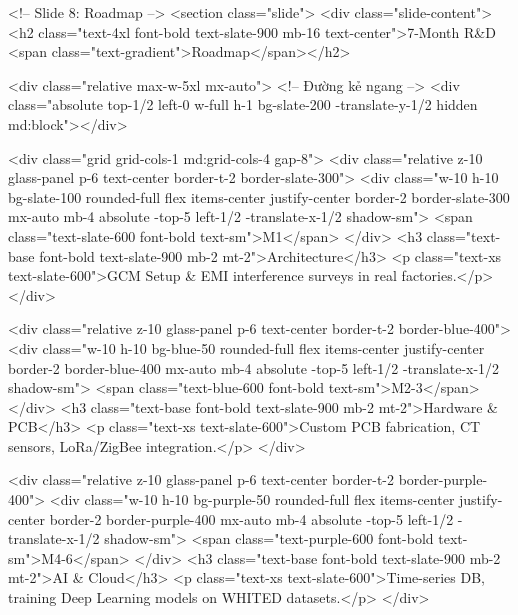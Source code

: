         <!-- Slide 8: Roadmap -->
        <section class="slide">
            <div class="slide-content">
                <h2 class="text-4xl font-bold text-slate-900 mb-16 text-center">7-Month R&D <span class="text-gradient">Roadmap</span></h2>
                
                <div class="relative max-w-5xl mx-auto">
                    <!-- Đường kẻ ngang -->
                    <div class="absolute top-1/2 left-0 w-full h-1 bg-slate-200 -translate-y-1/2 hidden md:block"></div>
                    
                    <div class="grid grid-cols-1 md:grid-cols-4 gap-8">
                        <div class="relative z-10 glass-panel p-6 text-center border-t-2 border-slate-300">
                            <div class="w-10 h-10 bg-slate-100 rounded-full flex items-center justify-center border-2 border-slate-300 mx-auto mb-4 absolute -top-5 left-1/2 -translate-x-1/2 shadow-sm">
                                <span class="text-slate-600 font-bold text-sm">M1</span>
                            </div>
                            <h3 class="text-base font-bold text-slate-900 mb-2 mt-2">Architecture</h3>
                            <p class="text-xs text-slate-600">GCM Setup & EMI interference surveys in real factories.</p>
                        </div>
                        
                        <div class="relative z-10 glass-panel p-6 text-center border-t-2 border-blue-400">
                            <div class="w-10 h-10 bg-blue-50 rounded-full flex items-center justify-center border-2 border-blue-400 mx-auto mb-4 absolute -top-5 left-1/2 -translate-x-1/2 shadow-sm">
                                <span class="text-blue-600 font-bold text-sm">M2-3</span>
                            </div>
                            <h3 class="text-base font-bold text-slate-900 mb-2 mt-2">Hardware & PCB</h3>
                            <p class="text-xs text-slate-600">Custom PCB fabrication, CT sensors, LoRa/ZigBee integration.</p>
                        </div>
                        
                        <div class="relative z-10 glass-panel p-6 text-center border-t-2 border-purple-400">
                            <div class="w-10 h-10 bg-purple-50 rounded-full flex items-center justify-center border-2 border-purple-400 mx-auto mb-4 absolute -top-5 left-1/2 -translate-x-1/2 shadow-sm">
                                <span class="text-purple-600 font-bold text-sm">M4-6</span>
                            </div>
                            <h3 class="text-base font-bold text-slate-900 mb-2 mt-2">AI & Cloud</h3>
                            <p class="text-xs text-slate-600">Time-series DB, training Deep Learning models on WHITED datasets.</p>
                        </div>
                        
